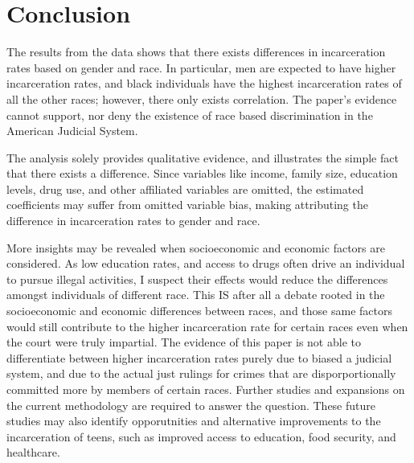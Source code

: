 \documentclass{article}
\begin{document}


\newpage

\section{Conclusion}

The results from the data shows that there exists differences in incarceration rates based on gender and race. In particular, men are expected to have higher incarceration rates, and black individuals have the highest incarceration rates of all the other races; however, there only exists correlation. The paper's evidence cannot support, nor deny the existence of race based discrimination in the American Judicial System. 

The analysis solely provides qualitative evidence, and illustrates the simple fact that there exists a difference. Since variables like income, family size, education levels, drug use, and other affiliated variables are omitted, the estimated coefficients may suffer from omitted variable bias, making attributing the difference in incarceration rates to gender and race. 

More insights may be revealed when socioeconomic and economic factors are considered. As low education rates, and access to drugs often drive an individual to pursue illegal activities, I suspect their effects would reduce the differences amongst individuals of different race. This IS after all a debate rooted in the socioeconomic and economic differences between races, and those same factors would still contribute to the higher incarceration rate for certain races even when the court were truly impartial. The evidence of this paper is not able to differentiate between higher incarceration rates purely due to biased a judicial system, and due to the actual just rulings for crimes that are disporportionally committed more by members of certain races. Further studies and expansions on the current methodology are required to answer the question. These future studies may also identify opporutnities and alternative improvements to the incarceration of teens, such as improved access to education, food security, and healthcare.
\end{document}
